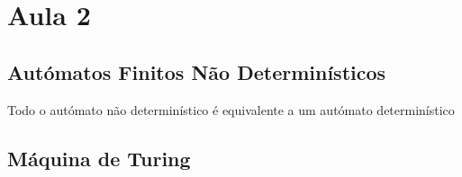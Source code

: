 \documentclass[a4paper]{article}
\begin{document}
    \section{Aula 2}
    \subsection{Autómatos Finitos Não Determinísticos}
    Todo o autómato não determinístico é equivalente a um autómato determinístico
    \subsection{Máquina de Turing}
\end{document}

